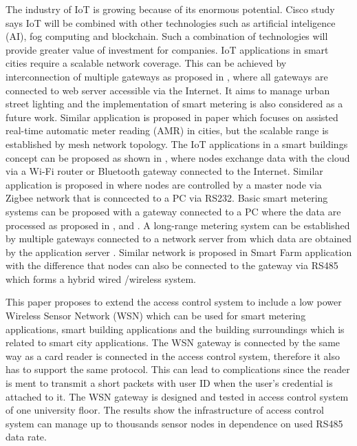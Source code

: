 The industry of IoT is growing because of its enormous potential.
Cisco study \cite{IoT cisco study} says IoT will be combined with other technologies such as artificial inteligence (AI), fog computing and blockchain. Such a combination of technologies will provide greater value of investment for companies. 
IoT applications in smart cities require a scalable network coverage. This can be achieved by interconnection of multiple gateways as proposed in \cite{Flexible Wireless Sensor Network for smart lighting applications}, where all gateways are connected to web server accessible via the Internet. It aims to manage urban street lighting and the implementation of smart metering is also considered as a future work.
Similar application is proposed in paper \cite{Design and Implementation of an IoT Assisted Real Time ZigBee Mesh WSN} which focuses on assisted real-time automatic meter reading (AMR) in cities, but the scalable range is established by mesh network topology.
The IoT applications in a smart buildings concept can be proposed as shown in
\cite{Internet of Things (IoT) for building Smart Home System}, where nodes exchange data with the cloud via a Wi-Fi router or Bluetooth gateway connected to the Internet. 
Similar application is proposed in \cite{Building a Smart Home System with WSN and Service Robot} where nodes are controlled by a master node via Zigbee network that is conncected to a PC via RS232.
Basic smart metering systems can be proposed with a gateway connected to a PC where the data are processed as proposed in \cite{A Meter Reading System Based on WSN}, \cite{Smart Water Meter System for User-Centric Consumption Measurement} and \cite{Radio Data Infrastructure for Remote Monitoring}.
A long-range metering system can be established by multiple gateways connected to a network server from which data are obtained by the application server \cite{Smart Electric Meter Using LoRA Protocols and Iot applications}. 
Similar network is proposed in Smart Farm application \cite{Implement Smart Farm with IoT Technology} with the difference that nodes can also be connected to the gateway via RS485 which forms a hybrid wired /wireless system.

This paper proposes to extend the access control system to include a low power Wireless Sensor Network (WSN) which can be used for smart metering applications, smart building applications and the building surroundings which is related to smart city applications. 
The WSN gateway is connected by the same way as a card reader is connected in the access control system, therefore it also has to support the same protocol. This can lead to complications since the reader is ment to transmit a short packets with user ID when the user's credential is attached to it. 
The WSN gateway is designed and tested in access control system of one university floor. The results show the infrastructure of access control system can manage up to thousands sensor nodes in dependence on used RS485 data rate. 


